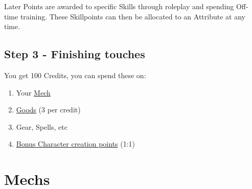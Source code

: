 \documentclass{book}
\begin{document}
    Later Points are awarded to specific Skills through roleplay and spending Off-time training.
    These Skillpoints can then be allocated to an Attribute at any time.

    \section{Step 3 - Finishing touches}\label{sec:step3-finishingtouches}
    You get 100 Credits, you can spend these on:
    \begin{enumerate}[label = -]
        \item Your \hyperref[ch:mechs]{Mech}
        \item \hyperref[ch:tradegoods]{Goods} (3 per credit)
        \item Gear, Spells, etc
        \item \hyperref[sec:step2-abilities]{Bonus Character creation points} (1:1)
    \end{enumerate}

    \chapter{Mechs}\label{ch:mechs}
    
\end{document}
